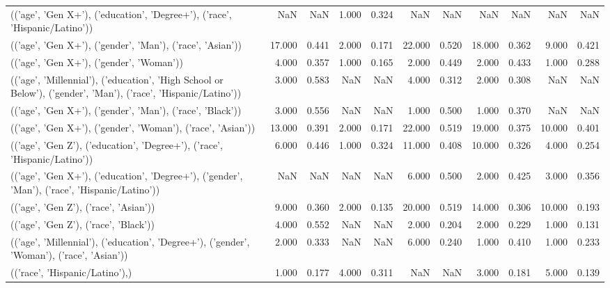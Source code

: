 \begin{tabular}{lrrrrrrrrrr}
(('age', 'Gen X+'), ('education', 'Degree+'), ('race', 'Hispanic/Latino')) & NaN & NaN & 1.000 & 0.324 & NaN & NaN & NaN & NaN & NaN & NaN \\
(('age', 'Gen X+'), ('gender', 'Man'), ('race', 'Asian')) & 17.000 & 0.441 & 2.000 & 0.171 & 22.000 & 0.520 & 18.000 & 0.362 & 9.000 & 0.421 \\
(('age', 'Gen X+'), ('gender', 'Woman')) & 4.000 & 0.357 & 1.000 & 0.165 & 2.000 & 0.449 & 2.000 & 0.433 & 1.000 & 0.288 \\
(('age', 'Millennial'), ('education', 'High School or Below'), ('gender', 'Man'), ('race', 'Hispanic/Latino')) & 3.000 & 0.583 & NaN & NaN & 4.000 & 0.312 & 2.000 & 0.308 & NaN & NaN \\
(('age', 'Gen X+'), ('gender', 'Man'), ('race', 'Black')) & 3.000 & 0.556 & NaN & NaN & 1.000 & 0.500 & 1.000 & 0.370 & NaN & NaN \\
(('age', 'Gen X+'), ('gender', 'Woman'), ('race', 'Asian')) & 13.000 & 0.391 & 2.000 & 0.171 & 22.000 & 0.519 & 19.000 & 0.375 & 10.000 & 0.401 \\
(('age', 'Gen Z'), ('education', 'Degree+'), ('race', 'Hispanic/Latino')) & 6.000 & 0.446 & 1.000 & 0.324 & 11.000 & 0.408 & 10.000 & 0.326 & 4.000 & 0.254 \\
(('age', 'Gen X+'), ('education', 'Degree+'), ('gender', 'Man'), ('race', 'Hispanic/Latino')) & NaN & NaN & NaN & NaN & 6.000 & 0.500 & 2.000 & 0.425 & 3.000 & 0.356 \\
(('age', 'Gen Z'), ('race', 'Asian')) & 9.000 & 0.360 & 2.000 & 0.135 & 20.000 & 0.519 & 14.000 & 0.306 & 10.000 & 0.193 \\
(('age', 'Gen Z'), ('race', 'Black')) & 4.000 & 0.552 & NaN & NaN & 2.000 & 0.204 & 2.000 & 0.229 & 1.000 & 0.131 \\
(('age', 'Millennial'), ('education', 'Degree+'), ('gender', 'Woman'), ('race', 'Asian')) & 2.000 & 0.333 & NaN & NaN & 6.000 & 0.240 & 1.000 & 0.410 & 1.000 & 0.233 \\
(('race', 'Hispanic/Latino'),) & 1.000 & 0.177 & 4.000 & 0.311 & NaN & NaN & 3.000 & 0.181 & 5.000 & 0.139 \\
\bottomrule
\end{tabular}
